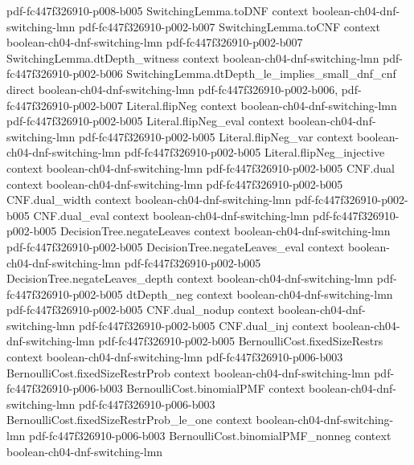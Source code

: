 \begin{theorem}
  {pdf-fc447f326910-p008-b005}
\proofstep
  {SwitchingLemma.toDNF}
  {context}
  {boolean-ch04-dnf-switching-lmn}
  {pdf-fc447f326910-p002-b007}
\proofstep
  {SwitchingLemma.toCNF}
  {context}
  {boolean-ch04-dnf-switching-lmn}
  {pdf-fc447f326910-p002-b007}
\proofstep
  {SwitchingLemma.dtDepth_witness}
  {context}
  {boolean-ch04-dnf-switching-lmn}
  {pdf-fc447f326910-p002-b006}
\proofstep
  {SwitchingLemma.dtDepth_le_implies_small_dnf_cnf}
  {direct}
  {boolean-ch04-dnf-switching-lmn}
  {pdf-fc447f326910-p002-b006,
    pdf-fc447f326910-p002-b007}
\proofstep
  {Literal.flipNeg}
  {context}
  {boolean-ch04-dnf-switching-lmn}
  {pdf-fc447f326910-p002-b005}
\proofstep
  {Literal.flipNeg_eval}
  {context}
  {boolean-ch04-dnf-switching-lmn}
  {pdf-fc447f326910-p002-b005}
\proofstep
  {Literal.flipNeg_var}
  {context}
  {boolean-ch04-dnf-switching-lmn}
  {pdf-fc447f326910-p002-b005}
\proofstep
  {Literal.flipNeg_injective}
  {context}
  {boolean-ch04-dnf-switching-lmn}
  {pdf-fc447f326910-p002-b005}
\proofstep
  {CNF.dual}
  {context}
  {boolean-ch04-dnf-switching-lmn}
  {pdf-fc447f326910-p002-b005}
\proofstep
  {CNF.dual_width}
  {context}
  {boolean-ch04-dnf-switching-lmn}
  {pdf-fc447f326910-p002-b005}
\proofstep
  {CNF.dual_eval}
  {context}
  {boolean-ch04-dnf-switching-lmn}
  {pdf-fc447f326910-p002-b005}
\proofstep
  {DecisionTree.negateLeaves}
  {context}
  {boolean-ch04-dnf-switching-lmn}
  {pdf-fc447f326910-p002-b005}
\proofstep
  {DecisionTree.negateLeaves_eval}
  {context}
  {boolean-ch04-dnf-switching-lmn}
  {pdf-fc447f326910-p002-b005}
\proofstep
  {DecisionTree.negateLeaves_depth}
  {context}
  {boolean-ch04-dnf-switching-lmn}
  {pdf-fc447f326910-p002-b005}
\proofstep
  {dtDepth_neg}
  {context}
  {boolean-ch04-dnf-switching-lmn}
  {pdf-fc447f326910-p002-b005}
\proofstep
  {CNF.dual_nodup}
  {context}
  {boolean-ch04-dnf-switching-lmn}
  {pdf-fc447f326910-p002-b005}
\proofstep
  {CNF.dual_inj}
  {context}
  {boolean-ch04-dnf-switching-lmn}
  {pdf-fc447f326910-p002-b005}
\proofstep
  {BernoulliCost.fixedSizeRestrs}
  {context}
  {boolean-ch04-dnf-switching-lmn}
  {pdf-fc447f326910-p006-b003}
\proofstep
  {BernoulliCost.fixedSizeRestrProb}
  {context}
  {boolean-ch04-dnf-switching-lmn}
  {pdf-fc447f326910-p006-b003}
\proofstep
  {BernoulliCost.binomialPMF}
  {context}
  {boolean-ch04-dnf-switching-lmn}
  {pdf-fc447f326910-p006-b003}
\proofstep
  {BernoulliCost.fixedSizeRestrProb_le_one}
  {context}
  {boolean-ch04-dnf-switching-lmn}
  {pdf-fc447f326910-p006-b003}
\proofstep
  {BernoulliCost.binomialPMF_nonneg}
  {context}
  {boolean-ch04-dnf-switching-lmn}

\end{theorem}
